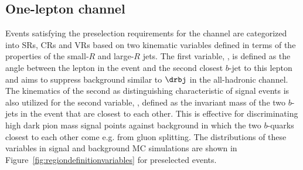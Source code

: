\subsection{One-lepton channel}
\label{sec:evtsel_onelep}
Events satisfying the preselection requirements for the \onelep channel are categorized into SRs, CRs and VRs based on two kinematic variables defined in terms of the properties of the small-$R$ and large-$R$ jets. The first variable, \deltaR, is defined as the angle between the lepton in the event and the second closest $b$-jet to this lepton and aims to suppress \ttbar background similar to $\drbj$ in the all-hadronic channel. 
The kinematics of the second \bjet as distinguishing characteristic of signal events is also utilized for the second variable, \bbinvm, defined as the invariant mass of the two $b$-jets in the event that are closest to each other. This is effective for discriminating high dark pion mass signal points against background in which the two $b$-quarks closest to each other come e.g. from gluon splitting. 
The distributions of these variables in signal and background MC simulations are shown in Figure~\ref{fig:regiondefinitionvariables} for preselected events. 

